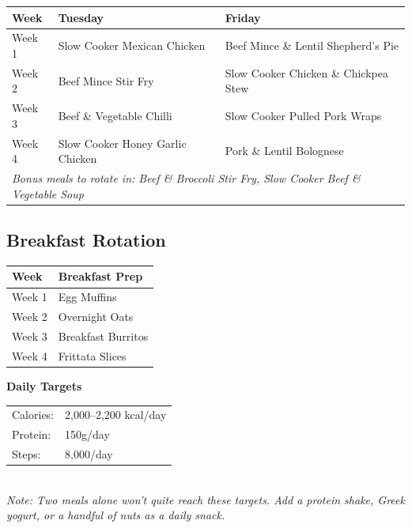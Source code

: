 \documentclass[12pt, a4paper]{book}
\begin{document}
\begin{tabularx}{\linewidth}{|l|X|X|}
  \hline
  \rowcolor{primary!20}
  \textbf{Week} & \textbf{Tuesday} & \textbf{Friday} \\
  \hline
  Week 1 & Slow Cooker Mexican Chicken & Beef Mince \& Lentil Shepherd's Pie \\
  \hline
  Week 2 & Beef Mince Stir Fry & Slow Cooker Chicken \& Chickpea Stew \\
  \hline
  Week 3 & Beef \& Vegetable Chilli & Slow Cooker Pulled Pork Wraps \\
  \hline
  Week 4 & Slow Cooker Honey Garlic Chicken & Pork \& Lentil Bolognese \\
  \hline
  \multicolumn{3}{|l|}{\textit{Bonus meals to rotate in: Beef \& Broccoli Stir Fry, Slow Cooker Beef \& Vegetable Soup}} \\
  \hline
\end{tabularx}

\vspace{1cm}

\subsection*{\textcolor{primary}{Breakfast Rotation}}

\begin{tabularx}{\linewidth}{|l|X|}
  \hline
  \rowcolor{primary!20}
  \textbf{Week} & \textbf{Breakfast Prep} \\
  \hline
  Week 1 & Egg Muffins \\
  \hline
  Week 2 & Overnight Oats \\
  \hline
  Week 3 & Breakfast Burritos \\
  \hline
  Week 4 & Frittata Slices \\
  \hline
\end{tabularx}

\vspace{1cm}

\begin{macrobox}
  \textbf{\textcolor{primary}{Daily Targets}} \\[4pt]
  \begin{tabular}{ll}
    Calories: & 2,000--2,200 kcal/day \\
    Protein:  & 150g/day \\
    Steps:    & 8,000/day \\
  \end{tabular}\\[6pt]
  \textit{Note: Two meals alone won't quite reach these targets. Add a protein shake, Greek yogurt, or a handful of nuts as a daily snack.}
\end{macrobox}
\end{document}
